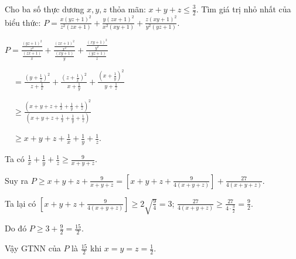 \begin{ex}%
    Cho ba số thực dương $x,y,z$ thỏa mãn: $x+y+z \le \displaystyle \frac{3}{2}$. Tìm giá trị nhỏ nhất của biểu thức: $\displaystyle P= \frac{x(yz+1)^2}{z^2(zx+1)} + \frac{y(zx+1)^2}{x^2(xy+1)}+ \frac{z(xy+1)^2}{y^2(yz+1)}$.
\loigiai
    {
    	
    $P= \displaystyle \frac{\displaystyle\frac{(yz+1)^2}{z^2}}{\displaystyle\frac{(zx+1)}{x}}+ \displaystyle \frac{\displaystyle\frac{(zx+1)^2}{x^2}}{\displaystyle\frac{(xy+1)}{y}} + \displaystyle \frac{\displaystyle\frac{(xy+1)^2}{y^2}}{\displaystyle\frac{(yz+1)}{z}}$
    
    $\quad = \displaystyle \frac{\left(y+\displaystyle\frac{1}{z}\right)^2}{z+\displaystyle\frac{1}{x}} +  \displaystyle \frac{\left(z+\displaystyle\frac{1}{x}\right)^2}{x+\displaystyle\frac{1}{y}} + \displaystyle \frac{\left(x+\displaystyle\frac{1}{y}\right)^2}{y+\displaystyle\frac{1}{z}}$
    
    $\quad \ge \displaystyle \frac{\left(x+y+z+\displaystyle\frac{1}{x}+ \displaystyle\frac{1}{y}+\displaystyle\frac{1}{z}\right)^2}{\left(x+y+z+\displaystyle\frac{1}{x}+ \displaystyle\frac{1}{y}+\displaystyle\frac{1}{z}\right)}$
    
    $\quad \ge \displaystyle x+y+z+\displaystyle\frac{1}{x}+ \displaystyle\frac{1}{y}+\displaystyle\frac{1}{z}$.
    
    Ta có $\displaystyle\frac{1}{x} + \frac{1}{y} + \frac{1}{z} \ge \frac{9}{x+y+z}$.
    
    Suy ra $P \ge \displaystyle x+y+z+\frac{9}{x+y+z}=\left[x+y+z+\frac{9}{4(x+y+z)}\right]+\frac{27}{4(x+y+z)}.$
    
    Ta lại có $\displaystyle \left[x+y+z + \frac{9}{4(x+y+z)}\right] \ge 2 \sqrt{\frac{9}{4}}=3$; $\displaystyle \frac{27}{4(x+y+z)} \ge \displaystyle \frac{27}{4\cdot \displaystyle \frac{3}{2}}=\frac{9}{2}$.
    
    Do đó $P \ge 3 + \displaystyle \frac{9}{2}=\displaystyle\frac{15}{2}$.
    
    Vậy GTNN của $P$ là $\displaystyle\frac{15}{2}$ khi $x=y=z=\displaystyle \frac{1}{2}$. 
    }
\end{ex}

